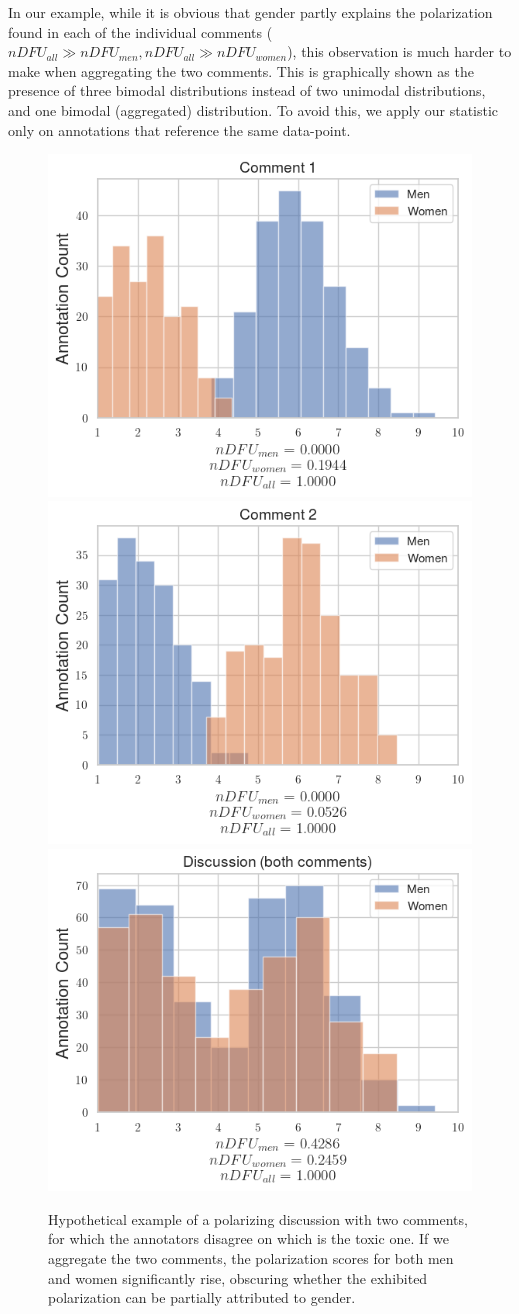 \documentclass{article}
\begin{document}
In our example, while it is obvious that gender partly explains the polarization found in each of the individual comments ($nDFU_{all} \gg nDFU_{men}, nDFU_{all} \gg nDFU_{women}$), this observation is much harder to make when aggregating the two comments. This is graphically shown as the presence of three bimodal distributions instead of two unimodal distributions, and one bimodal (aggregated) distribution. To avoid this, we apply our statistic only on annotations that reference the same data-point.

\begin{figure}
	\centering
    \includegraphics[width=0.3\linewidth]{ndfu_comment1.png}
    \includegraphics[width=0.3 \linewidth]{ndfu_comment2.png}
	\includegraphics[width=0.3 \linewidth]{ndfu_discussion.png}
	\caption{Hypothetical example of a polarizing discussion with two comments, for which the annotators disagree on which is the toxic one. If we aggregate the two comments, the polarization scores for both men and women significantly rise, obscuring whether the exhibited polarization can be partially attributed to gender. %
    }
	\label{fig:ndfu_multi_data-point}
\end{figure}
\end{document}
